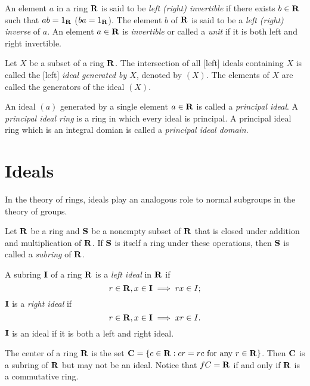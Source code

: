 \begin{defn}
An element $a$ in a ring $\mathbf{R}$ is said to be \emph{left (\resp right) 
invertible} if there exists $b \in \mathbf{R}$ such that $ab = 1_{\mathbf{R}}$ (\resp $ba = 
1_{\mathbf{R}}$). 
The element $b$ of $\mathbf{R}$ is said to be a \emph{left (\resp right) inverse} 
of $a$. 
An element $a \in \mathbf{R}$ is \emph{invertible} or called a \emph{unit} if it 
is both left and right invertible. 
\end{defn}

\begin{defn}
Let $X$ be a subset of a ring $\mathbf{R}$. The intersection of all [left] ideals 
containing $X$ is called the [left] \emph{ideal generated by $X$}, denoted 
by $(X)$. The elements of $X$ are called the generators of the ideal $(X)$. 

An ideal $(a)$ generated by a single element $a \in \mathbf{R}$ is called a 
\emph{principal ideal}. 
A \emph{principal ideal ring} is a ring in which every ideal is principal.  
A principal ideal ring which is an integral domian is called a 
\emph{principal ideal domain}. 
\end{defn}

\section{Ideals}
In the theory of rings, ideals play an analogous role to normal subgroups 
in the theory of groups. 

\begin{defn}
Let $\mathbf{R}$ be a ring and $\mathbf{S}$ be a nonempty subset of $\mathbf{R}$ that is closed 
under addition and multiplication of $\mathbf{R}$. 
If $\mathbf{S}$ is itself a ring under these operations, then $\mathbf{S}$ is called a 
\emph{subring} of $\mathbf{R}$. 

A subring $\mathbf{I}$ of a ring $\mathbf{R}$ is a \emph{left ideal} in $\mathbf{R}$ if 
\begin{equation}
    r \in \mathbf{R}, x \in \mathbf{I} \implies rx \in I;
\end{equation}
$\mathbf{I}$ is a \emph{right ideal} if 
\begin{equation}
    r \in \mathbf{R}, x \in \mathbf{I} \implies xr \in I.
\end{equation}
$\mathbf{I}$ is an ideal if it is both a left and right ideal. 
\end{defn}
\begin{example}
    The center of a ring $\mathbf{R}$ is the set $\mathbf{C} = \{c \in \mathbf{R}: cr = rc 
    \text{ for any } r \in \mathbf{R}\}$. Then $\mathbf{C}$ is a subring of $\mathbf{R}$ but may 
    not be an ideal. Notice that $fC = \mathbf{R}$ if and only if $\mathbf{R}$ is a 
    commutative ring. 
\end{example}


